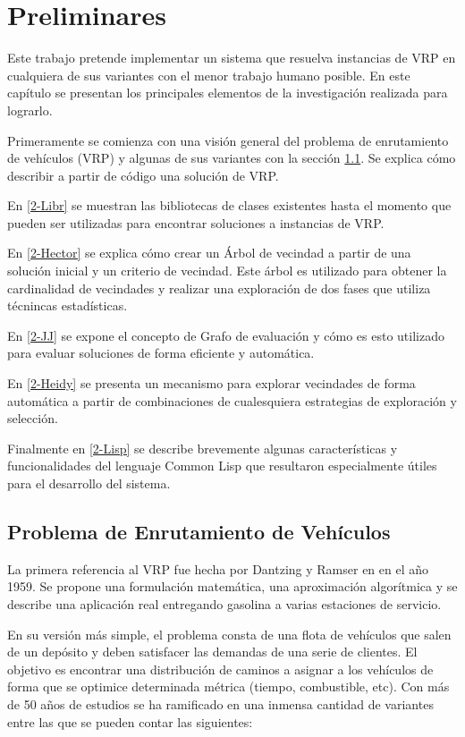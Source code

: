 \chapter{Preliminares}\label{chapter:REV-LL}

Este trabajo pretende implementar un sistema que resuelva instancias de VRP en cualquiera de sus variantes con el menor trabajo humano posible. En este capítulo se presentan los principales elementos de la investigación realizada para lograrlo.

Primeramente se comienza con una visión general del problema de enrutamiento de vehículos (VRP) y algunas de sus variantes con la sección \ref{2-VRPintro}. Se explica cómo describir a partir de código una solución de VRP.

 En \ref{2-Libr} se muestran las bibliotecas de clases existentes hasta el momento que pueden ser utilizadas para encontrar soluciones a instancias de VRP.
 
En \ref{2-Hector} se explica cómo crear un Árbol de vecindad a partir de una solución inicial y un criterio de vecindad. Este árbol es utilizado para obtener la cardinalidad de vecindades y realizar una exploración de dos fases que utiliza técnincas estadísticas.

En \ref{2-JJ} se expone el concepto de Grafo de evaluación y cómo es esto utilizado para evaluar soluciones de forma eficiente y automática.

En \ref{2-Heidy} se presenta un mecanismo para explorar vecindades de forma automática a partir de combinaciones de cualesquiera estrategias de exploración y selección.

Finalmente en \ref{2-Lisp} se describe brevemente algunas características y funcionalidades del lenguaje Common Lisp que resultaron especialmente útiles para el desarrollo del sistema.



\section{Problema de Enrutamiento de Vehículos}\label{2-VRPintro}
La primera referencia al VRP fue hecha por Dantzing y Ramser en \cite{Ramsin1959} en el año 1959. Se propone una formulación matemática, una aproximación algorítmica y se describe una aplicación real entregando gasolina a varias estaciones de servicio. 

En su versión más simple, el problema consta de una flota de vehículos que salen de un depósito y deben satisfacer las demandas de una serie de clientes. El objetivo es encontrar una distribución de caminos a asignar a los vehículos de forma que se optimice determinada métrica (tiempo, combustible, etc). Con más de 50 años de estudios se ha ramificado en una inmensa cantidad de variantes entre las que se pueden contar las siguientes:

